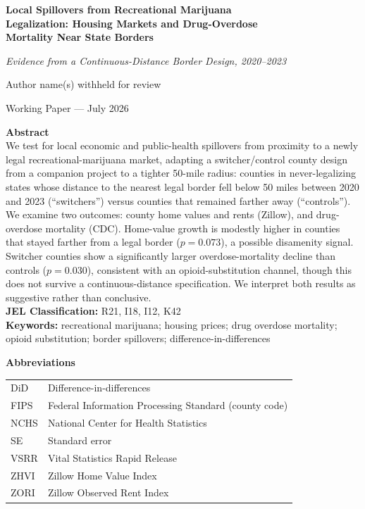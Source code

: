 \documentclass[11pt]{article}
\title{}
\author{}
\date{}
\begin{document}
\begin{titlepage}
\begin{center}
\vspace*{1.5cm}
{\LARGE \bfseries Local Spillovers from Recreational Marijuana\\
Legalization: Housing Markets and Drug-Overdose\\
Mortality Near State Borders\par}
\vspace{0.3cm}
{\large \itshape Evidence from a Continuous-Distance Border Design, 2020--2023\par}
\vspace{1.2cm}
{\large Author name(s) withheld for review\par}
\vspace{0.3cm}
{\normalsize Working Paper --- July 2026\par}
\end{center}

\vspace{1.2cm}
\noindent\textbf{Abstract} \\[4pt]
\noindent We test for local economic and public-health spillovers from
proximity to a newly legal recreational-marijuana market, adapting a
switcher/control county design from a companion project to a tighter
50-mile radius: counties in never-legalizing states whose distance to
the nearest legal border fell below 50 miles between 2020 and 2023
(``switchers'') versus counties that remained farther away
(``controls''). We examine two outcomes: county home values and rents
(Zillow), and drug-overdose mortality (CDC). Home-value growth is
modestly higher in counties that stayed farther from a legal border
($p=0.073$), a possible disamenity signal. Switcher counties show a
significantly larger overdose-mortality decline than controls
($p=0.030$), consistent with an opioid-substitution channel, though
this does not survive a continuous-distance specification. We
interpret both results as suggestive rather than conclusive. \\[10pt]
\noindent\textbf{JEL Classification:} R21, I18, I12, K42 \\
\noindent\textbf{Keywords:} recreational marijuana; housing prices;
drug overdose mortality; opioid substitution; border spillovers;
difference-in-differences

\vfill
\noindent\textbf{Abbreviations} \\[2pt]
\noindent
\begin{tabular}{@{}ll@{}}
DiD    & Difference-in-differences \\
FIPS   & Federal Information Processing Standard (county code) \\
NCHS   & National Center for Health Statistics \\
SE     & Standard error \\
VSRR   & Vital Statistics Rapid Release \\
ZHVI   & Zillow Home Value Index \\
ZORI   & Zillow Observed Rent Index \\
\end{tabular}


\end{titlepage}
\end{document}
